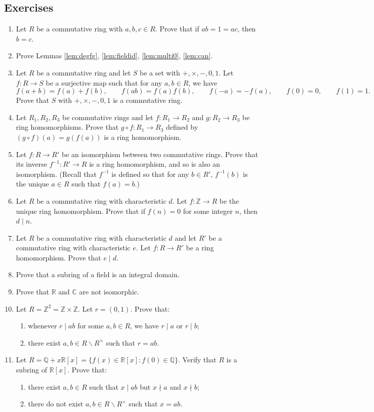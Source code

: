\documentclass{article}
\def\Z{{\mathbb Z}}
\def\R{{\mathbb R}}
\def\Q{{\mathbb Q}}
\def\Z{{\mathbb Z}}
\def\Q{{\mathbb Q}}
\def\C{{\mathbb C}}
\begin{document}
\subsection*{Exercises}
\begin{enumerate}[\thesection .1]
    \item Let $R$ be a commutative ring with $a,b,c\in R$. Prove that if $ab = 1 = ac$, then $b = c$.
    \item Prove Lemmas \ref{lem:degfg}, \ref{lem:fieldid}, \ref{lem:multi0}, \ref{lem:can}.
    \item Let $R$ be a commutative ring and let $S$ be a set with $+,\times,-,0,1$. Let $f:R\rightarrow S$ be a surjective map such that for any $a,b\in R$, we have $$f(a+b) = f(a) + f(b),\qquad f(ab) = f(a)f(b),\qquad f(-a) = -f(a),\qquad f(0) = 0,\qquad f(1) = 1.$$
    Prove that $S$ with $+,\times,-,0,1$ is a commutative ring.
    \item Let $R_1,R_2,R_3$ be commutative rings and let $f:R_1\rightarrow R_2$ and $g:R_2\rightarrow R_3$ be ring homomorphisms. Prove that $g\circ f:R_1\rightarrow R_3$ defined by $(g\circ f)(a) = g(f(a))$ is a ring homomorphism.
    \item Let $f:R\rightarrow R'$ be an isomorphism between two commutative rings. Prove that its inverse $f^{-1}:R'\rightarrow R$ is a ring homomorphism, and so is also an isomorphism. (Recall that $f^{-1}$ is defined so that for any $b\in R'$, $f^{-1}(b)$ is the unique $a\in R$ such that $f(a) = b$.)
    \item Let $R$ be a commutative ring with characteristic $d$. Let $f:\Z\rightarrow R$ be the unique ring homomorphism. Prove that if $f(n) = 0$ for some integer $n$, then $d\mid n$.
    \item Let $R$ be a commutative ring with characteristic $d$ and let $R'$ be a commutative ring with characteristic $e$. Let $f:R\rightarrow R'$ be a ring homomorphism. Prove that $e\mid d$.
    \item Prove that a subring of a field is an integral domain.
    \item Prove that $\R$ and $\C$ are not isomorphic.
    \item Let $R = \Z^2 = \Z\times\Z$. Let $r = (0,1)$. Prove that: 
    \begin{enumerate}
        \item whenever $r\mid ab$ for some $a,b\in R$, we have $r\mid a$ or $r\mid b$;
        \item there exist $a,b\in R\backslash R^\times$ such that $r = ab$.
    \end{enumerate}\label{exer:7.10}
    \item Let $R = \Q + x\R[x] = \{f(x)\in \R[x]\colon f(0)\in\Q\}$. Verify that $R$ is a subring of $\R[x]$. Prove that:
    \begin{enumerate}
        \item there exist $a,b\in R$ such that $x\mid ab$ but $x\nmid a$ and $x\nmid b$;
        \item there do not exist $a,b\in R\backslash R^\times$ such that $x = ab$.
    \end{enumerate}\label{exer:7.11}
\end{enumerate}
\end{document}
